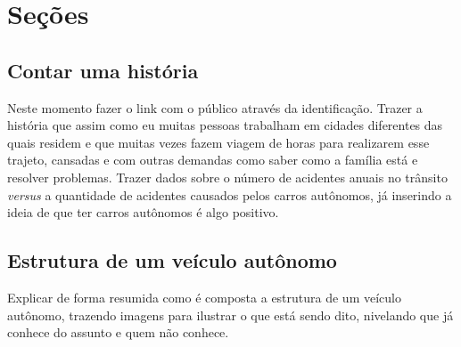 \documentclass[12pt,a4paper]{article}
\begin{document}
    
    \section{Seções}


    \subsection{Contar uma história}
    \par Neste momento fazer o link com o público através da identificação. Trazer a história que assim como eu muitas pessoas trabalham em cidades diferentes das quais residem e que muitas vezes fazem viagem de horas para realizarem esse trajeto, cansadas e com outras demandas como saber como a família está e resolver problemas. Trazer dados sobre o número de acidentes anuais no trânsito \textit{versus} a quantidade de acidentes causados pelos carros autônomos, já inserindo a ideia de que ter carros autônomos é algo positivo.



    \subsection{Estrutura de um veículo autônomo}
    \par Explicar de forma resumida como é composta a estrutura de um veículo autônomo, trazendo imagens para ilustrar o que está sendo dito, nivelando que já conhece do assunto e quem não conhece. 
\end{document}

